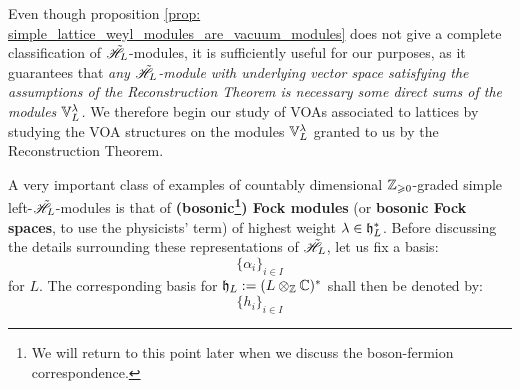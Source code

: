             Even though proposition \ref{prop: simple_lattice_weyl_modules_are_vacuum_modules} does not give a complete classification of $\tilde{\mathscr{H}}_L$-modules, it is sufficiently useful for our purposes, as it guarantees that \textit{any $\tilde{\mathscr{H}}_L$-module with underlying vector space satisfying the assumptions of the Reconstruction Theorem is necessary some direct sums of the modules $\mathbb{V}_L^{\lambda}$.} We therefore begin our study of VOAs associated to lattices by studying the VOA structures on the modules $\mathbb{V}_L^{\lambda}$ granted to us by the Reconstruction Theorem. 
            \begin{example} \label{example: bosonic_fock_modules}
                A very important class of examples of countably dimensional $\mathbb{Z}_{\geqslant 0}$-graded simple left-$\tilde{\mathscr{H}}_L$-modules is that of \textbf{(bosonic\footnote{We will return to this point later when we discuss the boson-fermion correspondence.}) Fock modules} (or \textbf{bosonic Fock spaces}, to use the physicists' term) of highest weight $\lambda \in \mathfrak{h}_L^*$. Before discussing the details surrounding these representations of $\tilde{\mathscr{H}}_L$, let us fix a basis:
                    $$\{\alpha_i\}_{i \in I}$$
                for $L$. The corresponding basis for $\h_L := (L \tensor_{\Z} \bbC)^*$ shall then be denoted by:
                    $$\{h_i\}_{i \in I}$$
                

\end{example}
